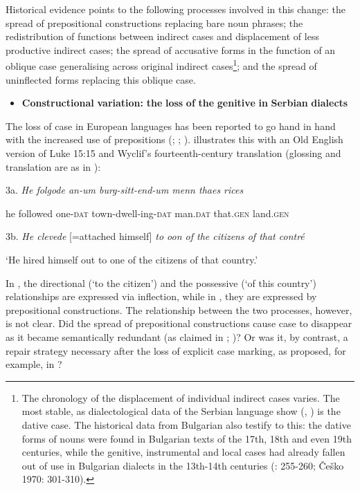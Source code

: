 \documentclass[output=paper]{langscibook}
\begin{document}
Historical evidence points to the following processes involved in this change: the spread of prepositional constructions replacing bare noun phrases; the redistribution of functions between indirect cases and displacement of less productive indirect cases; the spread of accusative forms in the function of an oblique case generalising across original indirect cases\footnote{The chronology of the displacement of individual indirect cases varies. The most stable, as dialectological data of the Serbian language show (\citealt{Belić1905}, \citealt{Miloradović2003}) is the dative case.  The historical data from Bulgarian also testify to this: the dative forms of nouns were found in Bulgarian texts of the 17th, 18th and even 19th centuries, while the genitive, instrumental and local cases had already fallen out of use in Bulgarian dialects in the 13th-14th centuries (\citealt{Mirčev1958}: 255-260; Če\textrm{š}ko 1970: 301-310).}; and the spread of uninflected forms replacing this oblique case.

\begin{itemize}
\item \begin{styleListParagraph}
\textbf{Constructional} \textbf{variation:} \textbf{the} \textbf{loss} \textbf{of} \textbf{the} \textbf{genitive} \textbf{in} \textbf{Serbian} \textbf{dialects}
\end{styleListParagraph}
\end{itemize}

The loss of case in European languages has been reported to go hand in hand with the increased use of prepositions (\citealt{Blake2004}; \citealt{HewsonBubenik2006}; \citealt{Kulikov2006}). \citet[178]{Blake2004} illustrates this with an Old English version of Luke 15:15  and Wyclif’s fourteenth-century translation  (glossing and translation are as in \citealt{Blake2004}):

3a. \textit{He    folgode       an-um        burg-sitt-end-um      menn                  thaes          rices}

he     followed  one-\textsc{dat}  town-dwell-ing-\textsc{dat}  man.\textsc{dat}            that.\textsc{gen}     land.\textsc{gen}

3b. \textit{He clevede} [=attached himself] \textit{to oon of the citizens of that contré}

‘He hired himself out to one of the citizens of that country.’

In , the directional (‘to the citizen’) and the possessive (‘of this country’) relationships are expressed via inflection, while in , they are expressed by prepositional constructions. The relationship between the two processes, however, is not clear. Did the spread of prepositional constructions cause case to disappear as it became semantically redundant (as claimed in \citealt{Hjelmslev1935}; \citealt{HewsonBubenik2006})? Or was it, by contrast, a repair strategy necessary after the loss of explicit case marking, as proposed, for example, in \citet{Skautrup1944}? 
\end{document}
